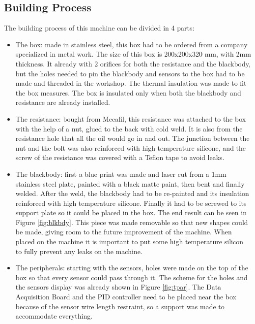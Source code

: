 \subsection{Building Process}

\par The building process of this machine can be divided in 4 parts:

\begin{itemize}
\item The box: made in stainless steel, this box had to be ordered from a company specialized in metal work. The size of this box is 200x200x320 mm, with 2mm thickness. It already with 2 orifices for both the resistance and the blackbody, but the holes needed to pin the blackbody and sensors to the box had to be made and threaded in the workshop. The thermal insulation was made to fit the box measures. The box is insulated only when both the blackbody and resistance are already installed.
\item The resistance: bought from Mecafil, this resistance was attached to the box with the help of a nut, glued to the back with cold weld. It is also from the resistance hole that all the oil would go in and out. The junction between the nut and the bolt was also reinforced with high temperature silicone, and the screw of the resistance was covered with a Teflon tape to avoid leaks.
\item The blackbody: first a blue print was made and laser cut from a 1mm stainless steel plate, painted with a black matte paint, then bent and finally welded. After the weld, the blackbody had to be re-painted and its insulation reinforced with high temperature silicone. Finally it had to be screwed to its support plate so it could be placed in the box. The end result can be seen in Figure \ref{fig:blkbdy}. This piece was made removable so that new shapes could be made, giving room to the future improvement of the machine. When placed on the machine it is important to put some high temperature silicon to fully prevent any leaks on the machine.
\item The peripherals: starting with the sensors, holes were made on the top of the box so that every sensor could pass through it. The scheme for the holes and the sensors display was already shown in Figure \ref{fig:tpar}. The Data Acquisition Board and the PID controller need to be placed near the box because of the sensor wire length restraint, so a support was made to accommodate everything.
\end{itemize}

